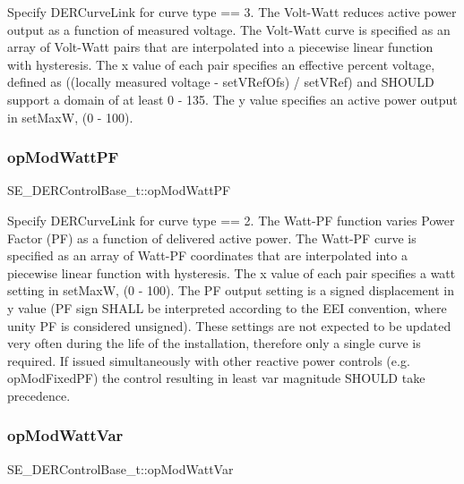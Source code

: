 Specify D\+E\+R\+Curve\+Link for curve type == 3. The Volt-\/\+Watt reduces active power output as a function of measured voltage. The Volt-\/\+Watt curve is specified as an array of Volt-\/\+Watt pairs that are interpolated into a piecewise linear function with hysteresis. The x value of each pair specifies an effective percent voltage, defined as ((locally measured voltage -\/ set\+V\+Ref\+Ofs) / set\+V\+Ref) and S\+H\+O\+U\+LD support a domain of at least 0 -\/ 135. The y value specifies an active power output in set\+MaxW, (0 -\/ 100). \mbox{\label{group__DERControlBase_ga15ce5a47c11d47a3e75630e935b0cd65}} 
\subsubsection{\texorpdfstring{op\+Mod\+Watt\+PF}{opModWattPF}}
{\footnotesize\ttfamily S\+E\+\_\+\+D\+E\+R\+Control\+Base\+\_\+t\+::op\+Mod\+Watt\+PF}

Specify D\+E\+R\+Curve\+Link for curve type == 2. The Watt-\/\+PF function varies Power Factor (PF) as a function of delivered active power. The Watt-\/\+PF curve is specified as an array of Watt-\/\+PF coordinates that are interpolated into a piecewise linear function with hysteresis. The x value of each pair specifies a watt setting in set\+MaxW, (0 -\/ 100). The PF output setting is a signed displacement in y value (PF sign S\+H\+A\+LL be interpreted according to the E\+EI convention, where unity PF is considered unsigned). These settings are not expected to be updated very often during the life of the installation, therefore only a single curve is required. If issued simultaneously with other reactive power controls (e.\+g. op\+Mod\+Fixed\+PF) the control resulting in least var magnitude S\+H\+O\+U\+LD take precedence. \mbox{\label{group__DERControlBase_gafbb4008251d74dc443b9ad4279bee1d1}} 
\subsubsection{\texorpdfstring{op\+Mod\+Watt\+Var}{opModWattVar}}
{\footnotesize\ttfamily S\+E\+\_\+\+D\+E\+R\+Control\+Base\+\_\+t\+::op\+Mod\+Watt\+Var}

